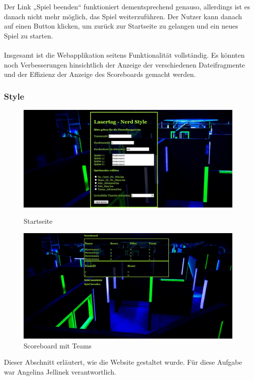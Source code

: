 Der Link „Spiel beenden“ funktioniert dementsprechend genauso, allerdings ist es danach nicht mehr möglich, das Spiel weiterzuführen. Der Nutzer kann danach auf einen Button klicken, um zurück zur Startseite zu gelangen und ein neues Spiel zu starten.\\\\
Insgesamt ist die Webapplikation seitens Funktionalität vollständig. Es könnten noch Verbesserungen hinsichtlich der Anzeige der verschiedenen Dateifragmente und der Effizienz der Anzeige des Scoreboards gemacht werden.


\subsubsection{Style}
\label{sec:services-style}

\begin{figure}[htb]
	\begin{center}
		\includegraphics[width=0.75 \textwidth]{websitemenue.JPG}
		\caption{Startseite}
		\label{fig:start}
	\end{center}
\begin{center}
	\includegraphics[width=0.75 \textwidth]{scoreboardteams.JPG}
	\caption{Scoreboard mit Teams}
	\label{fig:team}
\end{center}
\end{figure}
	
Dieser Abschnitt erläutert, wie die Website gestaltet wurde. Für diese Aufgabe war Angelina Jellinek verantwortlich.

